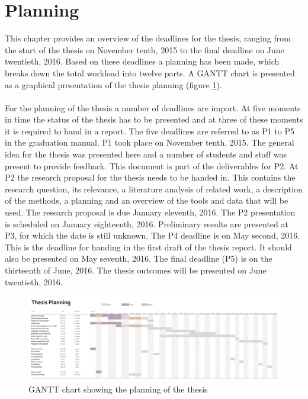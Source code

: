 

\section{Planning}
\label{chap:planning}

This chapter provides an overview of the deadlines for the thesis, ranging from the start of the thesis on November tenth, 2015 to the final deadline on June twentieth, 2016. Based on these deadlines a planning has been made, which breaks down the total workload into twelve parts. A GANTT chart is presented as a graphical presentation of the thesis planning (figure \ref{fig:GANTT}). \\ \mbox{} \\
For the planning of the thesis a number of deadlines are import. At five moments in time the status of the thesis has to be presented and at three of these moments it is required to hand in a report. The five deadlines are referred to as P1 to P5 in the graduation manual. P1 took place on November tenth, 2015. The general idea for the thesis was presented here and a number of students and staff was present to provide feedback. This document is part of the deliverables for P2. At P2 the research proposal for the thesis needs to be handed in. This contains the research question, its relevance, a literature analysis of related work, a description of the methods, a planning and an overview of the tools and data that will be used. The research proposal is due January eleventh, 2016. The P2 presentation is scheduled on January eighteenth, 2016. Preliminary results are presented at P3, for which the date is still unknown. The P4 deadline is on May second, 2016. This is the deadline for handing in the first draft of the thesis report. It should also be presented on May seventh, 2016. The final deadline (P5) is on the thirteenth of June, 2016. The thesis outcomes will be presented on June twentieth, 2016.

\begin{figure}
	\centering
	\includegraphics[width=1.5\linewidth, angle=90]{figs/GANTT-chart.png}
	\caption{GANTT chart showing the planning of the thesis}
	\label{fig:GANTT}
\end{figure}